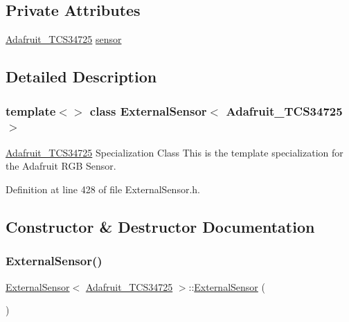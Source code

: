 \subsection*{Private Attributes}
\begin{DoxyCompactItemize}
\item 
\hyperlink{class_adafruit___t_c_s34725}{Adafruit\+\_\+\+T\+C\+S34725} \hyperlink{class_external_sensor_3_01_adafruit___t_c_s34725_01_4_aa1c5cc9eec53c08392f63346c9a4cd47}{sensor}
\end{DoxyCompactItemize}


\subsection{Detailed Description}
\subsubsection*{template$<$$>$\newline
class External\+Sensor$<$ Adafruit\+\_\+\+T\+C\+S34725 $>$}

\hyperlink{class_adafruit___t_c_s34725}{Adafruit\+\_\+\+T\+C\+S34725} Specialization Class This is the template specialization for the Adafruit R\+GB Sensor. 

Definition at line 428 of file External\+Sensor.\+h.



\subsection{Constructor \& Destructor Documentation}
\mbox{\label{class_external_sensor_3_01_adafruit___t_c_s34725_01_4_a3b1855d165d295332b53e074344e3281}} 
\subsubsection{\texorpdfstring{External\+Sensor()}{ExternalSensor()}}
{\footnotesize\ttfamily \hyperlink{class_external_sensor}{External\+Sensor}$<$ \hyperlink{class_adafruit___t_c_s34725}{Adafruit\+\_\+\+T\+C\+S34725} $>$\+::\hyperlink{class_external_sensor}{External\+Sensor} (\begin{DoxyParamCaption}{ }\end{DoxyParamCaption})\hspace{0.3cm}{\ttfamily [inline]}}

